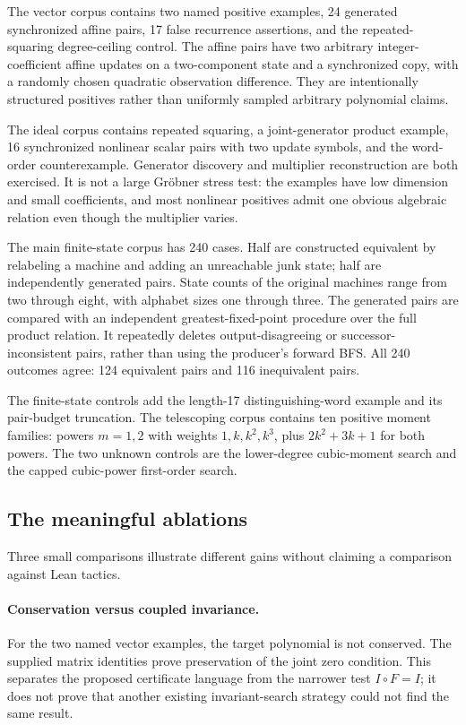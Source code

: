 The vector corpus contains two named positive examples, 24 generated synchronized affine pairs, 17 false recurrence assertions, and the repeated-squaring degree-ceiling control. The affine pairs have two arbitrary integer-coefficient affine updates on a two-component state and a synchronized copy, with a randomly chosen quadratic observation difference. They are intentionally structured positives rather than uniformly sampled arbitrary polynomial claims.

The ideal corpus contains repeated squaring, a joint-generator product example, 16 synchronized nonlinear scalar pairs with two update symbols, and the word-order counterexample. Generator discovery and multiplier reconstruction are both exercised. It is not a large Gr\"obner stress test: the examples have low dimension and small coefficients, and most nonlinear positives admit one obvious algebraic relation even though the multiplier varies.

The main finite-state corpus has 240 cases. Half are constructed equivalent by relabeling a machine and adding an unreachable junk state; half are independently generated pairs. State counts of the original machines range from two through eight, with alphabet sizes one through three. The generated pairs are compared with an independent greatest-fixed-point procedure over the full product relation. It repeatedly deletes output-disagreeing or successor-inconsistent pairs, rather than using the producer's forward BFS. All 240 outcomes agree: 124 equivalent pairs and 116 inequivalent pairs.

The finite-state controls add the length-17 distinguishing-word example and its pair-budget truncation. The telescoping corpus contains ten positive moment families: powers $m=1,2$ with weights $1,k,k^2,k^3$, plus $2k^2+3k+1$ for both powers. The two unknown controls are the lower-degree cubic-moment search and the capped cubic-power first-order search.

\subsection{The meaningful ablations}

Three small comparisons illustrate different gains without claiming a comparison against Lean tactics.

\paragraph{Conservation versus coupled invariance.}
For the two named vector examples, the target polynomial is not conserved. The supplied matrix identities prove preservation of the joint zero condition. This separates the proposed certificate language from the narrower test $I\circ F=I$; it does not prove that another existing invariant-search strategy could not find the same result.

